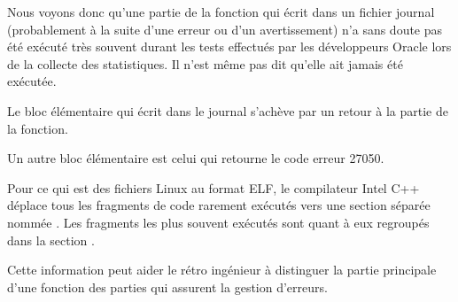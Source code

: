 Nous voyons donc qu'une partie de la fonction qui écrit dans un fichier journal (probablement à la 
suite d'une erreur ou d'un avertissement) n'a sans doute pas été exécuté très souvent durant les 
tests effectués par les développeurs Oracle lors de la collecte des statistiques. Il n'est même pas 
dit qu'elle ait jamais été exécutée.

Le bloc élémentaire qui écrit dans le journal s'achève par un retour à la partie  de la 
fonction.

Un autre bloc élémentaire  est celui qui retourne le code erreur 27050.

Pour ce qui est des fichiers Linux au format ELF, le compilateur Intel C++ déplace tous les 
fragments de code rarement exécutés vers une section séparée nommée . 
Les fragments les plus souvent exécutés sont quant à eux regroupés dans la section .

Cette information peut aider le rétro ingénieur à distinguer la partie principale d'une fonction 
des parties qui assurent la gestion d'erreurs.
